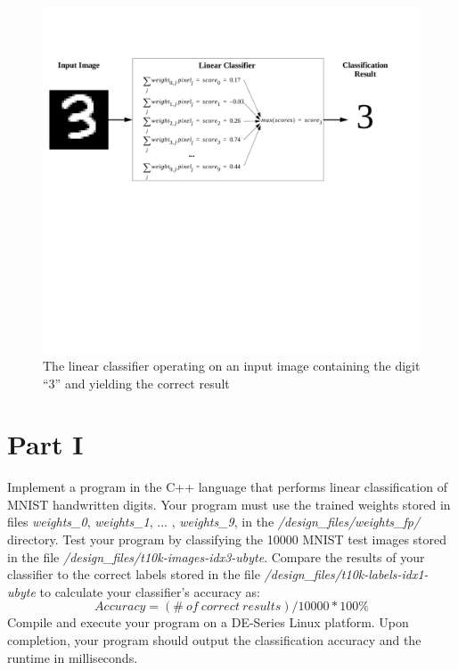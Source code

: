 \documentclass[epsfig,10pt,fullpage]{article}
\begin{document}
\begin{figure}[H]
   \begin{center}
       \includegraphics[scale=0.58]{figures/fig_linear_classifier}
   \end{center}
   \caption{The linear classifier operating on an input image containing the digit ``3'' and yielding the correct result}
	\label{fig:linear_classifier}
\end{figure}


\section*{Part I}
\noindent
Implement a program in the C++ language that performs linear classification of MNIST handwritten digits. 
Your program must use the trained weights stored in files \textit{weights\_0}, \textit{weights\_1}, ... , \textit{weights\_9}, in the \textit{/design\_files/weights\_fp/} directory. 
Test your program by classifying the 10000 MNIST test images stored in the file \textit{/design\_files/t10k-images-idx3-ubyte}. 
Compare the results of your classifier to the correct labels stored in the file \textit{/design\_files/t10k-labels-idx1-ubyte} to calculate
your classifier's accuracy as: \[Accuracy = (\#\ of\ correct\ results )/ 10000 * 100\% \]
Compile and execute your program on a DE-Series Linux platform.
Upon completion, your program should output the classification accuracy and the runtime in milliseconds.
\end{document}
